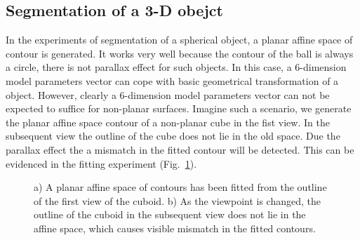 \subsection{Segmentation of a 3-D obejct}
\label{sec:s3o}
In the experiments of segmentation of a spherical object, a planar
affine space of contour is generated. It works very well because the
contour of the ball is always a circle, there is not parallax effect
for such objects. In this case, a 6-dimension model parameters vector
can cope with basic geometrical transformation of a object. However,
clearly a 6-dimension model parameters vector can not be expected to
suffice for non-planar surfaces. Imagine such a scenario, we generate the  planar affine
space contour of a non-planar cube in the fist view. In the
subsequent view the outline of the cube does not lie in the old
space. Due the parallax effect the a mismatch in the fitted contour
will be detected. This can be evidenced in the fitting experiment (Fig.~\ref{fig:box_mismatch}).
\begin{figure}[htbp]
  \begin{minipage}[t]{0.5\linewidth} 
    \centering 
  \end{minipage}%
  \begin{minipage}[t]{0.5\linewidth} 
    \centering 
  \end{minipage} 
  \caption[Planar space can not encompass a general non-planar
  contour]{a) A planar affine space of contours has been fitted from
    the outline of the first view of the cuboid. b) As the viewpoint
    is changed, the outline of the cuboid in the subsequent view does
    not lie in the affine space, which causes visible mismatch in the
    fitted contours.}
\label{fig:box_mismatch}
\end{figure}


